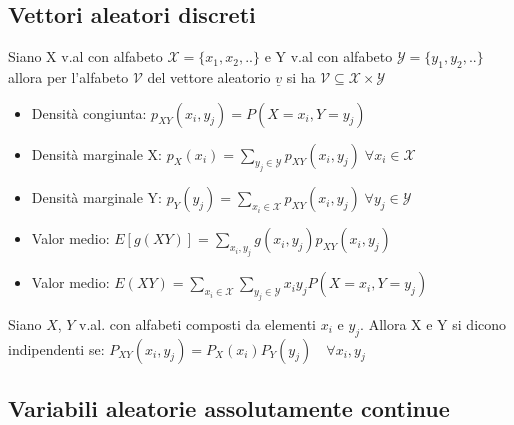 \documentclass[10pt,a4paper]{article}
\begin{document}
\begin{multicols}{2}
\subsection*{Vettori aleatori discreti}
Siano X v.al con alfabeto $\mathcal{X}=\{x_1,x_2,..\}$ e Y v.al con alfabeto $ \mathcal{Y}=\{y_1,y_2,..\}$ allora per l'alfabeto $\mathcal{V}$ del vettore aleatorio $\underline{v}$ si ha $\mathcal{V}\subseteq\mathcal{X}\times\mathcal{Y}$
\begin{itemize}
\item Densità congiunta: $p_{XY}(x_i, y_j) = P(X=x_i, Y=y_j)$
\item Densità marginale X: $p_X(x_i) = \sum\limits_{y_j \in \mathcal{Y}} p_{XY}(x_i,y_j) \; \forall x_i \in \mathcal{X}$
\item Densità marginale Y: $p_Y(y_j) = \sum\limits_{x_i \in \mathcal{X}} p_{XY}(x_i,y_j) \; \forall y_j \in \mathcal{Y}$
\item Valor medio: $E[g(XY)] = \sum\limits_{x_i, y_j} g(x_i, y_j) p_{XY}(x_i, y_j)$
\item Valor medio: $E(XY) = \sum\limits_{x_i \in \mathcal{X}} \sum\limits_{y_j \in \mathcal{Y}} x_i y_j P(X=x_i,Y=y_j)$
\end{itemize}
Siano $X$, $Y$ v.al. con alfabeti composti da elementi $x_i$ e $y_j$. Allora X e Y si dicono indipendenti se: $P_{XY}(x_i, y_j) = P_X(x_i)P_Y(y_j) \quad\forall x_i, y_j$


\subsection*{Variabili aleatorie assolutamente continue}


\end{multicols}
\end{document}
